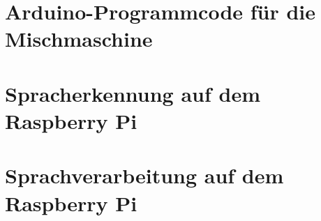 \chapter{Arduino-Programmcode für die Mischmaschine}\label{Anhang_A}


\chapter{Spracherkennung auf dem Raspberry Pi}\label{Anhang_B}


\chapter{Sprachverarbeitung auf dem Raspberry Pi}\label{Anhang_C}

